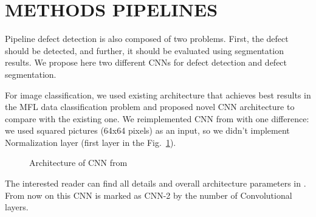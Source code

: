 \section{METHODS PIPELINES}
\label{METHODS PIPELINES}
%
Pipeline defect detection is also composed of two problems. First, the defect should be detected, and further, it should be evaluated using segmentation results.
We propose here two different CNNs for defect detection and defect segmentation.

For image classification, we used existing architecture that achieves best results in the MFL data classification problem and proposed novel CNN architecture to compare with the existing one.
We reimplemented CNN from \cite{Feng2017} with one difference: we used squared pictures (64x64 pixels) as an input, so we didn't implement Normalization layer (first layer in the Fig.~\ref{ris:CNN_feng2017}).
\begin{figure}[ht]
	\caption{Architecture of CNN from \cite{Feng2017}}
	\label{ris:CNN_feng2017}
\end{figure}
The interested reader can find all details and overall architecture parameters in \cite{Feng2017}.
From now on this CNN is marked as CNN-2 by the number of Convolutional layers.

